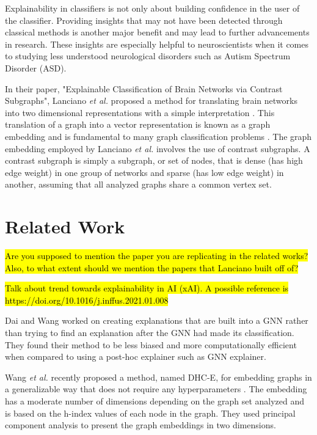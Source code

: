 \documentclass[sigconf]{acmart}
\begin{document}
Explainability in classifiers is not only about building confidence in the user of the classifier.
Providing insights that may not have been detected through classical methods is another major benefit and may lead to further advancements in research.
These insights are especially helpful to neuroscientists when it comes to studying less understood neurological disorders such as Autism Spectrum Disorder (ASD).

In their paper, "Explainable Classification of Brain Networks via Contrast Subgraphs", Lanciano \emph{et al.} proposed a method for translating brain networks into two dimensional representations with a simple interpretation \cite{lanciano2020}.
This translation of a graph into a vector representation is known as a graph embedding and is fundamental to many graph classification problems \cite{goyal2018}.
The graph embedding employed by Lanciano \emph{et al.} involves the use of contrast subgraphs.
A contrast subgraph is simply a subgraph, or set of nodes, that is dense (has high edge weight) in one group of networks and sparse (has low edge weight) in another, assuming that all analyzed graphs share a common vertex set.

\section{Related Work} \label{related-work}

\hl{Are you supposed to mention the paper you are replicating in the related works? Also, to what extent should we mention the papers that Lanciano built off of?}

\hl{Talk about trend towards explainability in AI (xAI). A possible reference is https://doi.org/10.1016/j.inffus.2021.01.008}

Dai and Wang worked on creating explanations that are built into a GNN \cite{dai2021} rather than trying to find an explanation after the GNN had made its classification.
They found their method to be less biased and more computationally efficient when compared to using a post-hoc explainer such as GNN explainer.

Wang \emph{et al.} recently proposed a method, named DHC-E, for embedding graphs in a generalizable way that does not require any hyperparameters \cite{wang2021}. The embedding has a moderate number of dimensions depending on the graph set analyzed and is based on the h-index values of each node in the graph. They used principal component analysis to present the graph embeddings in two dimensions.
\end{document}
